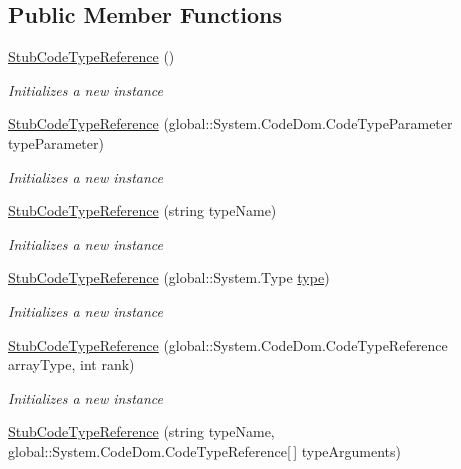 \subsection*{Public Member Functions}
\begin{DoxyCompactItemize}
\item 
\hyperlink{class_system_1_1_code_dom_1_1_fakes_1_1_stub_code_type_reference_af8594bc54aae0a6611a4fb8ab8840b20}{Stub\-Code\-Type\-Reference} ()
\begin{DoxyCompactList}\small\item\em Initializes a new instance\end{DoxyCompactList}\item 
\hyperlink{class_system_1_1_code_dom_1_1_fakes_1_1_stub_code_type_reference_a5afff064cb3421bccbdacb7d36be0977}{Stub\-Code\-Type\-Reference} (global\-::\-System.\-Code\-Dom.\-Code\-Type\-Parameter type\-Parameter)
\begin{DoxyCompactList}\small\item\em Initializes a new instance\end{DoxyCompactList}\item 
\hyperlink{class_system_1_1_code_dom_1_1_fakes_1_1_stub_code_type_reference_a66e9440134cf33d7b890274bd4e48e6b}{Stub\-Code\-Type\-Reference} (string type\-Name)
\begin{DoxyCompactList}\small\item\em Initializes a new instance\end{DoxyCompactList}\item 
\hyperlink{class_system_1_1_code_dom_1_1_fakes_1_1_stub_code_type_reference_ac918381e649a759342b26116d4837841}{Stub\-Code\-Type\-Reference} (global\-::\-System.\-Type \hyperlink{jquery-1_810_82-vsdoc_8js_a3940565e83a9bfd10d95ffd27536da91}{type})
\begin{DoxyCompactList}\small\item\em Initializes a new instance\end{DoxyCompactList}\item 
\hyperlink{class_system_1_1_code_dom_1_1_fakes_1_1_stub_code_type_reference_ae3c97bb6c98b45560a8aead2ad90eded}{Stub\-Code\-Type\-Reference} (global\-::\-System.\-Code\-Dom.\-Code\-Type\-Reference array\-Type, int rank)
\begin{DoxyCompactList}\small\item\em Initializes a new instance\end{DoxyCompactList}\item 
\hyperlink{class_system_1_1_code_dom_1_1_fakes_1_1_stub_code_type_reference_a10045f4cd03d85d4c80d53b3aa8b21d7}{Stub\-Code\-Type\-Reference} (string type\-Name, global\-::\-System.\-Code\-Dom.\-Code\-Type\-Reference\mbox{[}$\,$\mbox{]} type\-Arguments)

\end{DoxyCompactItemize}
